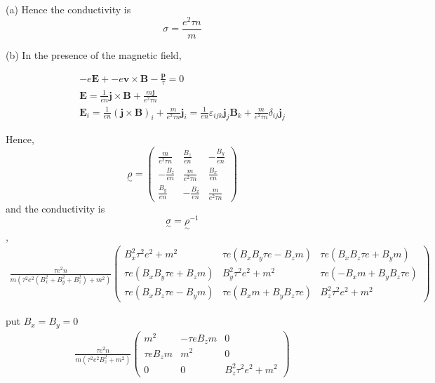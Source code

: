 \documentclass[a4paper,11pt]{article}
\begin{document}
(a) Hence the conductivity is 
\begin{equation}
    \sigma =\frac{e^2\tau n}{m}
\end{equation}

(b) In the presence of the magnetic field,

\begin{gather}
    -e\mathbf E+-e\mathbf v\times\mathbf B-\frac{\mathbf p}{\tau} = 0 \\
    \mathbf E = \frac{1}{en}\mathbf j\times\mathbf B+\frac{m\mathbf j}{e^2\tau n} \\
    \mathbf E_i = \frac{1}{en}(\mathbf j\times\mathbf B)_i+\frac{m}{e^2\tau n}\mathbf j_i= \frac{1}{en}\varepsilon_{ijk}\mathbf j_j\mathbf B_k+\frac{m}{e^2\tau n}\delta_{ij}\mathbf j_j
\end{gather}

Hence, 
\begin{equation}
    \underset{\sim}{\rho} = \begin{pmatrix}
        \frac{m}{e^2\tau n} & \frac{B_z}{en} & -\frac{B_y}{en}\\
        -\frac{B_z}{en} & \frac{m}{e^2\tau n} & \frac{B_x}{en} \\
        \frac{B_y}{en} & -\frac{B_x}{en} & \frac{m}{e^2\tau n} 
    \end{pmatrix}
\end{equation}
and the conductivity is $$\underset{\sim}{\sigma} = \underset{\sim}{\rho}^{-1}$$, 
\begin{gather}
    \frac{\tau e^{2} n}{m \left(\tau^{2} e^{2} \left(B_{x}^{2} + B_{y}^{2} + B_{z}^{2}\right) + m^{2}\right)} 
    \begin{pmatrix}B_{x}^{2} \tau^{2} e^{2} + m^{2} & \tau e \left(B_{x} B_{y} \tau e - B_{z} m\right) & \tau e \left(B_{x} B_{z} \tau e + B_{y} m\right)\\\tau e \left(B_{x} B_{y} \tau e + B_{z} m\right) & B_{y}^{2} \tau^{2} e^{2} + m^{2} & \tau e \left(- B_{x} m + B_{y} B_{z} \tau e\right)\\\tau e \left(B_{x} B_{z} \tau e - B_{y} m\right) & \tau e \left(B_{x} m + B_{y} B_{z} \tau e\right) & B_{z}^{2} \tau^{2} e^{2} + m^{2}\end{pmatrix}
\end{gather}

put $B_x=B_y=0$
\begin{gather}
    \frac{\tau e^{2} n}{m \left(\tau^{2} e^{2} B_{z}^{2} + m^{2}\right)} 
    \begin{pmatrix}
    m^{2} & -\tau e B_{z} m & 0\\
    \tau e B_{z} m & m^{2} & 0\\
    0 & 0 & B_{z}^{2} \tau^{2} e^{2} + m^{2}
    \end{pmatrix}
\end{gather}
\end{document}
